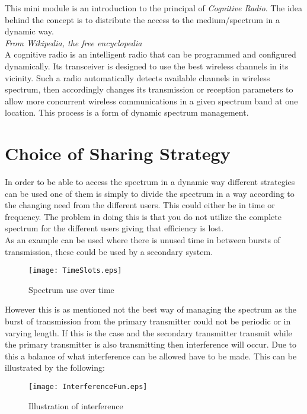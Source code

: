 This mini module is an introduction to the principal of \textit{Cognitive Radio}. The idea behind the concept is to distribute  the access to the medium/spectrum in a dynamic way. \\

\textit{From Wikipedia, the free encyclopedia}\\
A cognitive radio is an intelligent radio that can be programmed and configured dynamically. Its transceiver is designed to use the best wireless channels in its vicinity. Such a radio automatically detects available channels in wireless spectrum, then accordingly changes its transmission or reception parameters to allow more concurrent wireless communications in a given spectrum band at one location. This process is a form of dynamic spectrum management.

\section{Choice of Sharing Strategy}
In order to be able to access the spectrum in a dynamic way different strategies can be used one of them is simply to divide the spectrum in a way according to the changing need from the different users. This could either be in time or frequency. The problem in doing this is that you do not utilize the complete spectrum for the different users giving that efficiency is lost.\\

As an example can be used  where there is unused time in between bursts of transmission, these could be used by a secondary system.  
\begin{figure}[!h]
  \centering
  \texttt{[image: TimeSlots.eps]}
  \caption{Spectrum use over time}
  \label{fig:TimeSlots}
\end{figure}

However this is as mentioned not the best way of managing the spectrum as the burst of transmission from the primary transmitter could not be periodic or in varying length. If this is the case and the secondary transmitter transmit while the primary transmitter is also transmitting then interference will occur. Due to this a balance of what interference can be allowed have to be made. This can be illustrated by the following:
\begin{figure}[!h]
  \centering
  \texttt{[image: InterferenceFun.eps]}
  \caption{Illustration of interference}
  \label{fig:InterferenceFun}
\end{figure}

